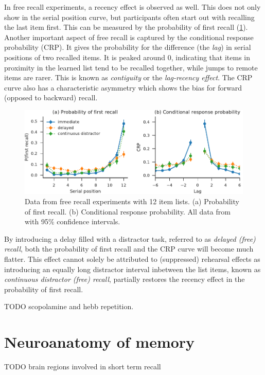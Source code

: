 In free recall experiments, a recency effect is observed as well.
This does not only show in the serial position curve, but participants often start out with recalling the last item first.
This can be measured by the probability of first recall (\cref{fig:exp-free-recall}).
Another important aspect of free recall is captured by the conditional response probability (CRP).
It gives the probability for the difference (the \emph{lag}) in serial positions of two recalled items.
It is peaked around 0, indicating that items in proximity in the learned list tend to be recalled together, while jumps to remote items are rarer.
This is known as \emph{contiguity} or the \emph{lag-recency effect}.
The CRP curve also has a characteristic asymmetry which shows the bias for forward (opposed to backward) recall.
\begin{figure}
    \centering
    \includegraphics{figures/exp-free-recall}
    \caption[Free recall probablitiy of first recall and CRP]{Data from free recall experiments with 12 item lists. (a) Probability of first recall. (b) Conditional response probability. All data from \textcite{Howard1999} with 95\% confidence intervals.}\label{fig:exp-free-recall}
\end{figure}

By introducing a delay filled with a distractor task, referred to as \emph{delayed (free) recall}, both the probability of first recall and the CRP curve will become much flatter.
This effect cannot solely be attributed to (suppressed) rehearsal effects as introducing an equally long distractor interval inbetween the list items, known as \emph{continuous distractor (free) recall}, partially restores the recency effect in the probability of first recall.

TODO scopolamine and hebb repetition.


\section{Neuroanatomy of memory}
TODO brain regions involved in short term recall

